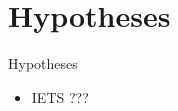 \section{Hypotheses}

\begin{frame}{Hypotheses}
    \begin{itemize}
        \item IETS ???
    \end{itemize}
\end{frame}
